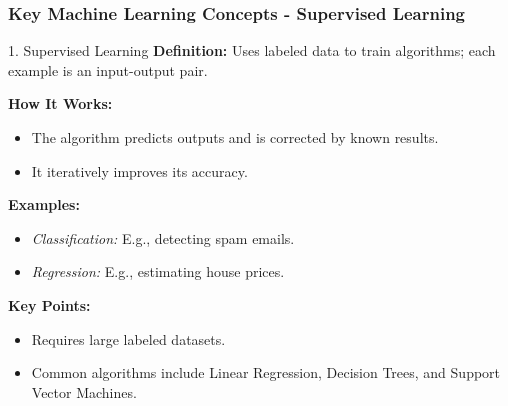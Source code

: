 \documentclass[aspectratio=169]{beamer}
\begin{document}
\begin{frame}[fragile]
    \frametitle{Key Machine Learning Concepts - Supervised Learning}
    \begin{block}{1. Supervised Learning}
        \textbf{Definition:} Uses labeled data to train algorithms; each example is an input-output pair.

        \textbf{How It Works:}
        \begin{itemize}
            \item The algorithm predicts outputs and is corrected by known results.
            \item It iteratively improves its accuracy.
        \end{itemize}
 
        \textbf{Examples:}
        \begin{itemize}
            \item \textit{Classification:} E.g., detecting spam emails.
            \item \textit{Regression:} E.g., estimating house prices.
        \end{itemize}

        \textbf{Key Points:}
        \begin{itemize}
            \item Requires large labeled datasets.
            \item Common algorithms include Linear Regression, Decision Trees, and Support Vector Machines.
        \end{itemize}
    \end{block}
\end{frame}
\end{document}

